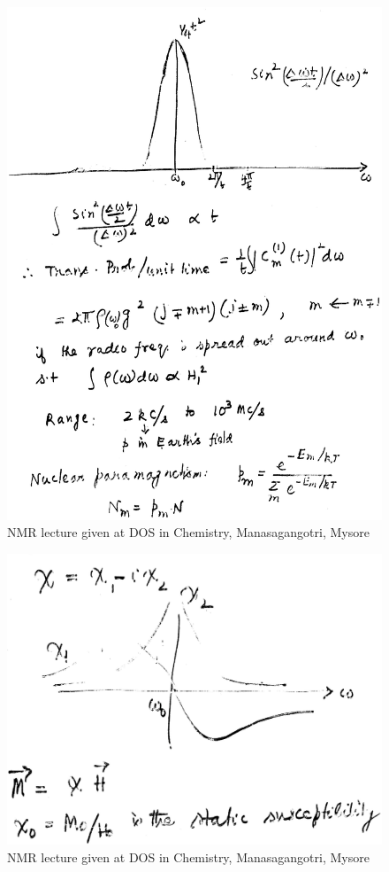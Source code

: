 \begin{figure}[H]
\centering
\includegraphics[scale=0.48]{src/images/chap8/6.eps}
\caption{NMR lecture given at DOS in Chemistry, Manasagangotri, Mysore}
\end{figure}
\begin{figure}[H]
\centering
\includegraphics[scale=0.26]{src/images/chap8/7.eps}
\caption{NMR lecture given at DOS in Chemistry, Manasagangotri, Mysore}
\end{figure}
\vskip 1cm

